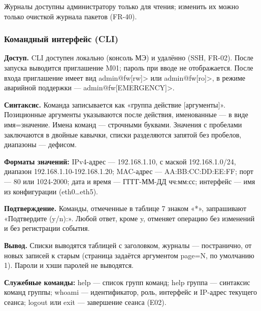 \documentclass[13pt,a4paper,final]{article}
\begin{document}
	Журналы доступны администратору только для чтения; изменить их можно только очисткой журнала пакетов (FR-40).
	
	\subsubsection{Командный интерфейс (CLI)}
	\textbf{Доступ.} CLI доступен локально (консоль МЭ) и удалённо (SSH, FR-02). После запуска выводится приглашение M01; пароль при вводе не отображается. После входа приглашение имеет вид admin@fw[rw]> или admin@fw[ro]>, в режиме аварийной поддержки — admin@fw[EMERGENCY]>.
	
	\textbf{Синтаксис.} Команда записывается как «группа действие [аргументы]». Позиционные аргументы указываются после действия, именованные — в виде имя=значение. Имена команд — строчными буквами. Значения с пробелами заключаются в двойные кавычки, списки разделяются запятой без пробелов, диапазоны — дефисом.
	
	\textbf{Форматы значений:} IPv4-адрес — 192.168.1.10, с маской 192.168.1.0/24, диапазон 192.168.1.10-192.168.1.20; MAC-адрес — AA:BB:CC:DD:EE:FF; порт — 80 или 1024-2000; дата и время — ГГГГ-ММ-ДД чч:мм:сс; интерфейс — имя из конфигурации (eth0…eth5).
	
	\textbf{Подтверждение.} Команды, отмеченные в таблице 7 знаком «*», запрашивают «Подтвердите (y/n):». Любой ответ, кроме y, отменяет операцию без изменений и без регистрации события.
	
	\textbf{Вывод.} Списки выводятся таблицей с заголовком, журналы — постранично, от новых записей к старым (страница задаётся аргументом page=N, по умолчанию 1). Пароли и хэши паролей не выводятся.
	
	\textbf{Служебные команды:} help — список групп команд; help группа — синтаксис команд группы; whoami — идентификатор, роль, интерфейс и IP-адрес текущего сеанса; logout или exit — завершение сеанса (E02).
	
\end{document}
